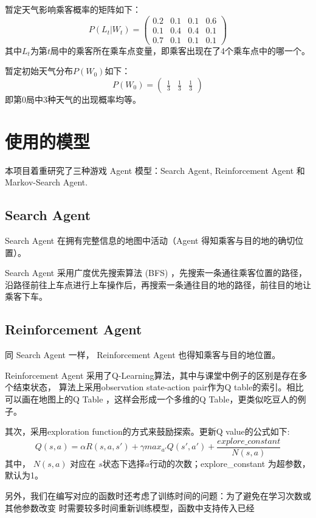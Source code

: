 \documentclass{article}
\begin{document}
\begin{CJK}{UTF8}{gbsn}
暂定天气影响乘客概率的矩阵如下：
$$P(L_t|W_t)=\begin{pmatrix}
  0.2 & 0.1 & 0.1 & 0.6 \\
  0.1&0.4&0.4&0.1\\
  0.7&0.1&0.1&0.1
\end{pmatrix}$$
其中$L_t$为第$t$局中的乘客所在乘车点变量，即乘客出现在了4个乘车点中的哪一个。

暂定初始天气分布$P(W_0)$如下：
$$P(W_0)=\begin{pmatrix}
  \frac{1}{3} & \frac{1}{3} & \frac{1}{3}
\end{pmatrix}$$
即第0局中3种天气的出现概率均等。

\section{使用的模型}
本项目着重研究了三种游戏 Agent 模型：Search Agent, Reinforcement Agent 和 Markov-Search Agent.

\subsection{Search Agent}
Search Agent 在拥有完整信息的地图中活动（Agent 得知乘客与目的地的确切位置）。

Search Agent 采用广度优先搜索算法 (BFS) ，先搜索一条通往乘客位置的路径，沿路径前往上车点进行上车操作后，再搜索一条通往目的地的路径，前往目的地让乘客下车。

\subsection{Reinforcement Agent}
同 Search Agent 一样， Reinforcement Agent 也得知乘客与目的地位置。

Reinforcement Agent 采用了Q-Learning算法，其中与课堂中例子的区别是存在多个结束状态，
算法上采用observation state-action pair作为Q table的索引。相比可以画在地图上的Q Table
，这样会形成一个多维的Q Table，更类似吃豆人的例子。 

其次，采用exploration function的方式来鼓励探索。更新Q value的公式如下: 
$$
Q(s,a) = \alpha R(s,a,s')+\gamma max_{a'}Q(s',a') + \frac{explore\_constant}{N(s,a)}
$$
其中， $N(s,a)$ 对应在 $s$状态下选择$a$行动的次数；explore\_constant 为超参数，默认为1。

另外，我们在编写对应的函数时还考虑了训练时间的问题：为了避免在学习次数或其他参数改变
时需要较多时间重新训练模型，函数中支持传入已经


\end{CJK}
\end{document}
